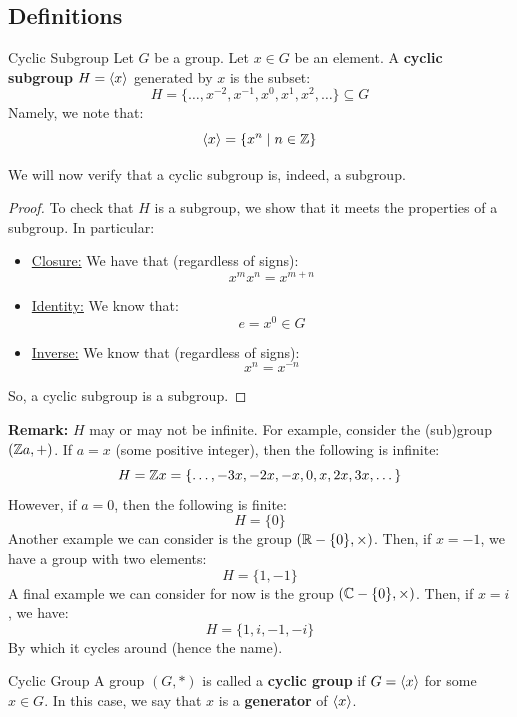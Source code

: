 \documentclass[letterpaper]{article}
\begin{document}
\subsection{Definitions}
\begin{definition}{Cyclic Subgroup}{}
    Let $G$ be a group. Let $x \in G$ be an element. A \textbf{cyclic subgroup} $H = \langle x \rangle$ generated by $x$ is the subset: 
    \[H = \{\dots, x^{-2}, x^{-1}, x^0, x^1, x^2, \dots\} \subseteq G\]
    Namely, we note that:
    \[\langle x \rangle = \{x^n \mid n \in \mathbb{Z}\}\]
\end{definition}
We will now verify that a cyclic subgroup is, indeed, a subgroup. 
\begin{mdframed}
    \begin{proof}
        To check that $H$ is a subgroup, we show that it meets the properties of a subgroup. In particular:
        \begin{itemize}
            \item \underline{Closure:} We have that (regardless of signs): 
            \[x^m x^n = x^{m + n}\]

            \item \underline{Identity:} We know that: 
            \[e = x^0 \in G\]

            \item \underline{Inverse:} We know that (regardless of signs): 
            \[x^n = x^{-n}\]
        \end{itemize}
        So, a cyclic subgroup is a subgroup. 
    \end{proof}
\end{mdframed}

\textbf{Remark:} $H$ may or may not be infinite. For example, consider the (sub)group $(\mathbb{Z} a, +)$. If $a = x$ (some positive integer), then the following is infinite: 
\[H = \mathbb{Z} x = \{\dots, -3x, -2x, -x, 0, x, 2x, 3x, \dots\}\]
However, if $a = 0$, then the following is finite: 
\[H = \{0\}\] 
Another example we can consider is the group $(\mathbb{R} - \{0\}, \times)$. Then, if $x = -1$, we have a group with two elements: 
\[H = \{1, -1\}\]
A final example we can consider for now is the group $(\mathbb{C} - \{0\}, \times)$. Then, if $x = i$, we have: 
\[H = \{1, i, -1, -i\}\]
By which it cycles around (hence the name). 

\begin{definition}{Cyclic Group}{}
    A group $(G, *)$ is called a \textbf{cyclic group} if $G = \langle x \rangle$ for some $x \in G$. In this case, we say that $x$ is a \textbf{generator} of $\langle x \rangle$. 
\end{definition}
\end{document}
